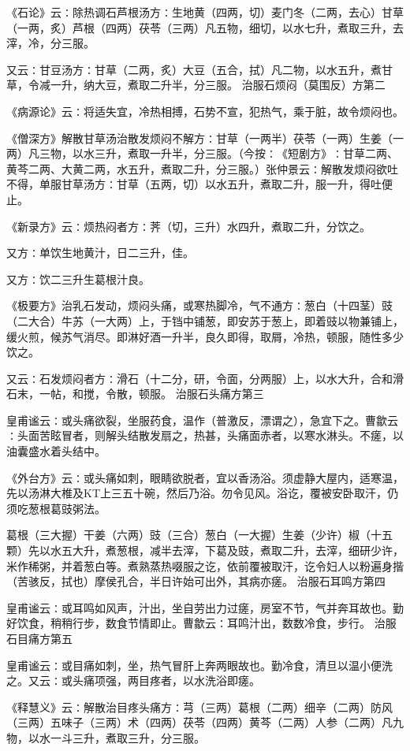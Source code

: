 \documentclass[a4paper,12pt,UTF8,twoside]{ctexbook}
\begin{document}
《石论》云∶除热调石芦根汤方∶生地黄（四两，切）麦门冬（二两，去心）甘草（一两，炙）芦根（四两）茯苓（三两）凡五物，细切，以水七升，煮取三升，去滓，冷，分三服。

又云∶甘豆汤方∶甘草（二两，炙）大豆（五合，拭）凡二物，以水五升，煮甘草，令减一升，纳大豆，煮取二升半，分三服。
治服石烦闷（莫围反）方第二

《病源论》云∶将适失宜，冷热相搏，石势不宣，犯热气，乘于脏，故令烦闷也。

《僧深方》解散甘草汤治散发烦闷不解方∶甘草（一两半）茯苓（一两）生姜（一两）凡三物，以水三升，煮取一升半，分三服。（今按∶《短剧方》∶甘草二两、黄芩二两、大黄二两，水五升，煮取二升，分三服。）张仲景云∶解散发烦闷欲吐不得，单服甘草汤方∶甘草（五两，切）以水五升，煮取二升，服一升，得吐便止。

《新录方》云∶烦热闷者方∶荠（切，三升）水四升，煮取二升，分饮之。

又方∶单饮生地黄汁，日二三升，佳。

又方∶饮二三升生葛根汁良。

《极要方》治乳石发动，烦闷头痛，或寒热脚冷，气不通方∶葱白（十四茎）豉（二大合）牛苏（一大两）上，于铛中铺葱，即安苏于葱上，即着豉以物兼铺上，缓火煎，候苏气消尽。即淋好酒一升半，良久即得，取屑，冷热，顿服，随性多少饮之。

又云∶石发烦闷者方∶滑石（十二分，研，令面，分两服）上，以水大升，合和滑石末，一帖，和搅，令散，顿服。
治服石头痛方第三

皇甫谧云∶或头痛欲裂，坐服药食，温作（普激反，漂谓之），急宜下之。曹歙云∶头面苦眩冒者，则解头结散发扇之，热甚，头痛面赤者，以寒水淋头。不瘥，以油囊盛水着头结中。

《外台方》云∶或头痛如刺，眼睛欲脱者，宜以香汤浴。须虚静大屋内，适寒温，先以汤淋大椎及KT上三五十碗，然后乃浴。勿令见风。浴讫，覆被安卧取汗，仍须吃葱根葛豉粥法。

葛根（三大握）干姜（六两）豉（三合）葱白（一大握）生姜（少许）椒（十五颗）先以水五大升，煮葱根，减半去滓，下葛及豉，煮取二升，去滓，细研少许，米作稀粥，并着葱白等。煮熟蒸热啜服之讫，依前覆被取汗，讫令妇人以粉遍身揩（苦骇反，拭也）摩侯孔合，半日许始可出外，其病亦瘥。
治服石耳鸣方第四

皇甫谧云∶或耳鸣如风声，汁出，坐自劳出力过瘥，房室不节，气并奔耳故也。勤好饮食，稍稍行步，数食节情即止。曹歙云∶耳鸣汁出，数数冷食，步行。
治服石目痛方第五

皇甫谧云∶或目痛如刺，坐，热气冒肝上奔两眼故也。勤冷食，清旦以温小便洗之。又云∶或头痛项强，两目疼者，以水洗浴即瘥。

《释慧义》云∶解散治目疼头痛方∶芎（三两）葛根（二两）细辛（二两）防风（三两）五味子（三两）术（四两）茯苓（四两）黄芩（二两）人参（二两）凡九物，以水一斗三升，煮取三升，分三服。
\end{document}
